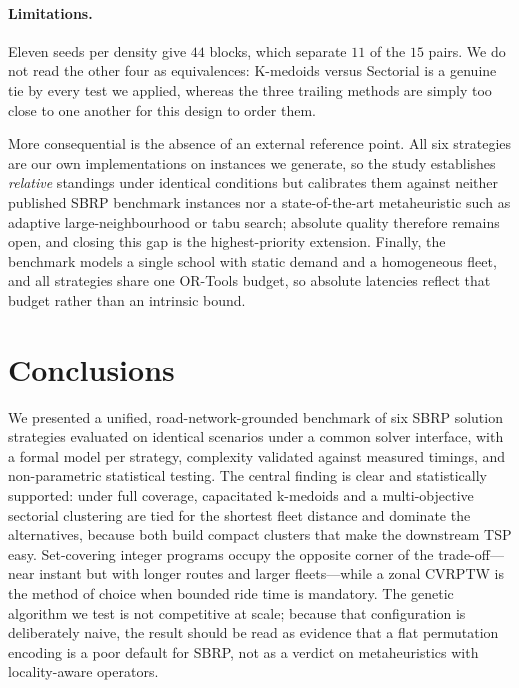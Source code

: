 \documentclass[runningheads]{llncs}
\begin{document}
\paragraph{Limitations.}
Eleven seeds per density give $44$ blocks, which separate $11$ of the
$15$ pairs. We do not read the other four as equivalences: K-medoids
versus Sectorial is a genuine tie by every test we applied, whereas the
three trailing methods are simply too close to one another for this
design to order them.

More consequential is the absence of an external reference point. All six
strategies are our own implementations on instances we generate, so the
study establishes \emph{relative} standings under identical conditions
but calibrates them against neither published SBRP benchmark instances
nor a state-of-the-art metaheuristic such as adaptive large-neighbourhood
or tabu search; absolute quality therefore remains open, and closing this
gap is the highest-priority extension. Finally, the benchmark models a
single school with static demand and a homogeneous fleet, and all
strategies share one OR-Tools budget, so absolute latencies reflect that
budget rather than an intrinsic bound.

\section{Conclusions}\label{sec:conclusions}
We presented a unified, road-network-grounded benchmark of six SBRP
solution strategies evaluated on identical scenarios under a common
solver interface, with a formal model per strategy, complexity
validated against measured timings, and non-parametric statistical
testing. The central finding is clear
and statistically supported: under full coverage, capacitated
k-medoids and a multi-objective sectorial clustering are tied for the
shortest fleet distance and dominate the alternatives, because both
build compact clusters that make the downstream TSP easy. Set-covering
integer programs occupy the opposite corner of the trade-off---near
instant but with longer routes and larger fleets---while a zonal
CVRPTW is the method of choice when bounded ride time is mandatory. The
genetic algorithm we test is not competitive at scale; because that
configuration is deliberately naive, the result should be read as
evidence that a flat permutation encoding is a poor default for SBRP,
not as a verdict on metaheuristics with locality-aware operators.
\end{document}
